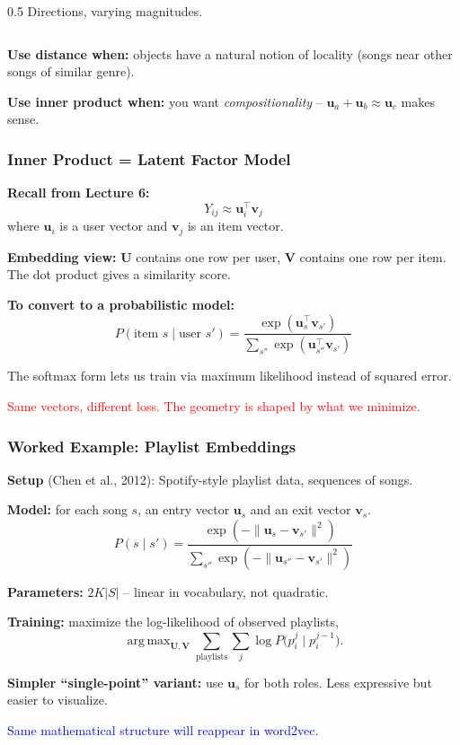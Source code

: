 \documentclass[notes,11pt, aspectratio=169]{beamer}
\DeclareMathOperator*{\argmax}{arg\,max}
\newcommand{\vu}{\mathbf{u}}
\newcommand{\vv}{\mathbf{v}}
\newcommand{\vU}{\mathbf{U}}
\newcommand{\vV}{\mathbf{V}}
\begin{document}
\begin{frame}
\begin{columns}[T]
\begin{column}{0.5\textwidth}
\vspace{4pt}
{\small Directions, varying magnitudes.}
\end{column}
\end{columns}

\vspace{12pt}
\textbf{Use distance when:} objects have a natural notion of locality (songs near other songs of similar genre).

\textbf{Use inner product when:} you want \emph{compositionality} -- $\vu_a + \vu_b \approx \vu_c$ makes sense.
\end{frame}

\begin{frame}
\frametitle{Inner Product = Latent Factor Model}

\textbf{Recall from Lecture 6:}
\[
    Y_{ij} \approx \vu_i^\top \vv_j
\]
where $\vu_i$ is a user vector and $\vv_j$ is an item vector.

\vspace{8pt}
\textbf{Embedding view:} $\vU$ contains one row per user, $\vV$ contains one row per item. The dot product gives a similarity score.

\vspace{8pt}
\textbf{To convert to a probabilistic model:}
\[
    P(\text{item } s \mid \text{user } s') = \frac{\exp(\vu_s^\top \vv_{s'})}{\sum_{s''} \exp(\vu_{s''}^\top \vv_{s'})}
\]

\vspace{4pt}
The softmax form lets us train via maximum likelihood instead of squared error.

\vspace{6pt}
\textcolor{red}{Same vectors, different loss. The geometry is shaped by what we minimize.}
\end{frame}

\begin{frame}
\frametitle{Worked Example: Playlist Embeddings}

\textbf{Setup} (Chen et al., 2012): Spotify-style playlist data, sequences of songs.

\vspace{4pt}
\textbf{Model:} for each song $s$, an entry vector $\vu_s$ and an exit vector $\vv_s$.
\[
    P(s \mid s') = \frac{\exp(-\|\vu_s - \vv_{s'}\|^2)}{\sum_{s''} \exp(-\|\vu_{s''} - \vv_{s'}\|^2)}
\]

\vspace{4pt}
\textbf{Parameters:} $2K|S|$ -- linear in vocabulary, not quadratic.

\vspace{8pt}
\textbf{Training:} maximize the log-likelihood of observed playlists,
\[
    \argmax_{\vU, \vV} \sum_{\text{playlists}} \sum_{j} \log P\bigl(p_i^j \mid p_i^{j-1}\bigr).
\]

\vspace{6pt}
\textbf{Simpler ``single-point'' variant:} use $\vu_s$ for both roles. Less expressive but easier to visualize.

\vspace{4pt}
\textcolor{blue}{Same mathematical structure will reappear in word2vec.}
\end{frame}
\end{document}
